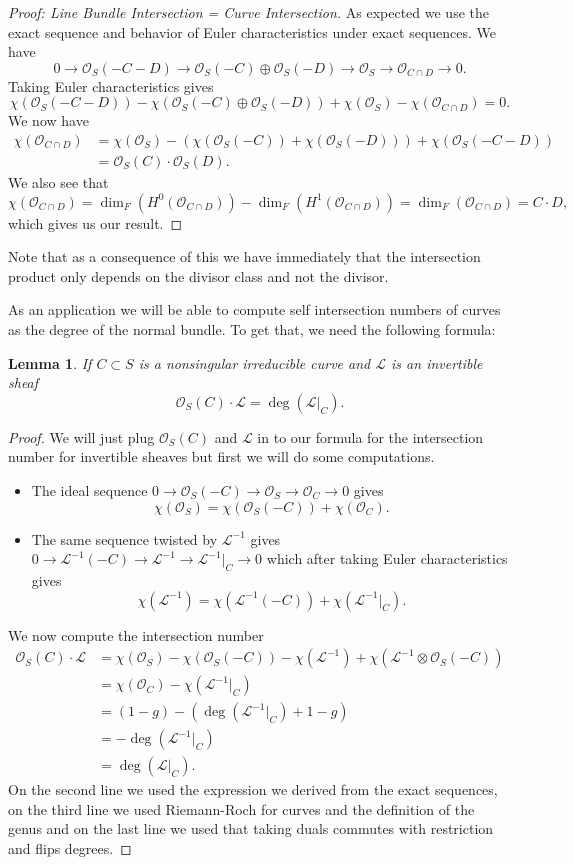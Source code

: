 \documentclass[12pt]{article}
\numberwithin{equation}{section}
\newtheorem{lemma}[theorem]{Lemma}
\theoremstyle{definition}
\theoremstyle{remark}
\newcommand{\Ocal}{\mathcal{O}}
\newcommand{\Lcal}{\mathcal{L}}
\begin{document}
\begin{proof}[Proof: Line Bundle Intersection = Curve Intersection]
As expected we use the exact sequence and behavior of Euler characteristics under exact sequences. 
We have 
$$0\to \Ocal_S(-C-D) \to \Ocal_S(-C) \oplus \Ocal_S(-D) \to \Ocal_S \to \Ocal_{C\cap D} \to 0. $$
Taking Euler characteristics gives 
$$\chi(\Ocal_S(-C-D)) - \chi( \Ocal_S(-C) \oplus \Ocal_S(-D)) + \chi(\Ocal_S) -\chi(\Ocal_{C\cap D})=0.$$
We now have 
\begin{align*}
\chi(\Ocal_{C\cap D}) &= \chi(\Ocal_S) - \left( \chi(\Ocal_S(-C)) + \chi(\Ocal_S(-D)) \right) + \chi( \Ocal_S(-C-D)) \\
&= \Ocal_S(C) \cdot \Ocal_S(D).
\end{align*}
We also see that 
$$\chi(\Ocal_{C\cap D}) = \dim_F(H^0(\Ocal_{C\cap D}))- \dim_F(H^1(\Ocal_{C\cap D}))= \dim_F(\Ocal_{C\cap D}) = C\cdot D,$$
which gives us our result. 
\end{proof}
Note that as a consequence of this we have immediately that the intersection product only depends on the divisor class and not the divisor.

As an application we will be able to compute self intersection numbers of curves as the degree of the normal bundle. 
To get that, we need the following formula:
\begin{lemma}
	If $C \subset S$ is a nonsingular irreducible curve and $\Lcal$ is an invertible sheaf
	 $$ \Ocal_S(C)\cdot \Lcal = \deg(\Lcal\vert_C).$$
\end{lemma} 
\begin{proof}
	We will just plug $\Ocal_S(C)$ and $\Lcal$ in to our formula for the intersection number for invertible sheaves but first we will do some computations. 
	\begin{itemize}
		\item The ideal sequence $ 0 \to \Ocal_S(-C) \to \Ocal_S \to \Ocal_C \to 0$
		gives 
		$$\chi(\Ocal_S) = \chi(\Ocal_S(-C)) + \chi(\Ocal_C).$$
		\item The same sequence twisted by $\Lcal^{-1}$ gives $0\to \Lcal^{-1}(-C)\to\Lcal^{-1} \to \Lcal^{-1}\vert_C \to 0$ which after taking Euler characteristics gives 
		 $$ \chi(\Lcal^{-1}) = \chi(\Lcal^{-1}(-C))+\chi(\Lcal^{-1}\vert_C).$$
	\end{itemize}
	We now compute the intersection number
	\begin{align*}
	\Ocal_S(C) \cdot \Lcal &= \chi(\Ocal_S) - \chi(\Ocal_S(-C)) - \chi(\Lcal^{-1}) + \chi(\Lcal^{-1}\otimes \Ocal_S(-C)) \\
	 &=\chi(\Ocal_C) - \chi(\Lcal^{-1}\vert_C)\\
	 &= (1-g) - \left( \deg(\Lcal^{-1}\vert_C) + 1-g \right)\\
	 &= -\deg(\Lcal^{-1}\vert_C)\\
	 &= \deg(\Lcal\vert_C). 
	\end{align*}
	On the second line we used the expression we derived from the exact sequences, on the third line we used Riemann-Roch for curves and the definition of the genus and on the last line we used that taking duals commutes with restriction and flips degrees. 
\end{proof}
\end{document}
